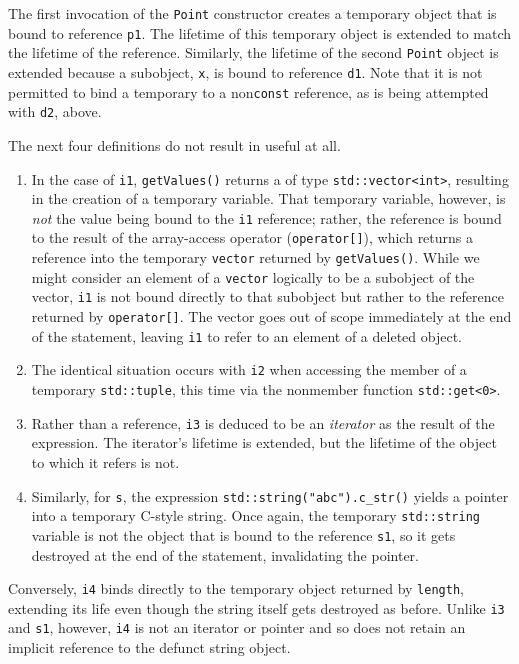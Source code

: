 {{{\noindent The first invocation of the \lstinline!Point! constructor creates a
temporary object that is bound to reference \lstinline!p1!. The lifetime of
this temporary object is extended to match the lifetime of the
reference. Similarly, the lifetime of the second \lstinline!Point! object
is extended because a subobject, \lstinline!x!, is bound to reference
\lstinline!d1!. Note that it is not permitted to bind a temporary to a
non\lstinline!const!  reference, as is being attempted with
\lstinline!d2!, above.

The next four definitions do not result in useful  at all.
\begin{enumerate}
\item{In the case of \lstinline!i1!, \lstinline!getValues()! returns a  of type \lstinline!std::vector<int>!, resulting in the creation of a temporary variable. That temporary variable, however, is \emph{not} the value being bound to the \lstinline!i1! reference; rather, the reference is bound to the result of the array-access operator (\lstinline!operator[]!), which returns a reference into the temporary \lstinline!vector! returned by \lstinline!getValues()!. While we might consider an element of a \lstinline!vector! logically to be a subobject of the vector, \lstinline!i1! is not bound directly to that subobject but rather to the reference returned by \lstinline!operator[]!. The vector goes out of scope immediately at the end of the statement, leaving \lstinline!i1! to refer to an element of a deleted object.}
\item{The identical situation occurs with \lstinline!i2! when accessing the member of a temporary \lstinline!std::tuple!, this time via the nonmember function \lstinline!std::get<0>!.}
\item{Rather than a reference, \lstinline!i3! is deduced to be an \emph{iterator} as the result of the expression. The iterator’s lifetime is extended, but the lifetime of the object to which it refers is not.}
\item{Similarly, for \lstinline!s!, the expression \lstinline!std::string("abc").c_str()! yields a pointer into a temporary C-style string. Once again, the temporary \lstinline!std::string! variable is not the object that is bound to the reference \lstinline!s1!, so it gets destroyed at the end of the statement, invalidating the pointer.}
\end{enumerate}

Conversely, \lstinline!i4! binds directly to the temporary object returned
by \lstinline!length!, extending its life even though the string itself
gets destroyed as before. Unlike \lstinline!i3! and \lstinline!s1!, however,
\lstinline!i4! is not an iterator or pointer and so does not retain an
implicit reference to the defunct string object.

}}}
